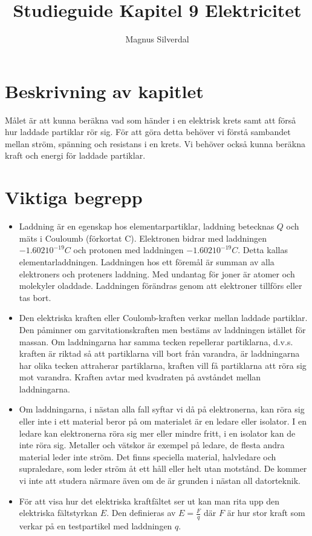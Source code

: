 \documentclass[11pt]{article}
\title{Studieguide Kapitel 9 Elektricitet}
\author{Magnus Silverdal}
\begin{document}
    \maketitle
    \section{Beskrivning av kapitlet}
    Målet är att kunna beräkna vad som händer i en elektrisk krets samt att förså hur laddade partiklar rör sig. För att
    göra detta behöver vi förstå sambandet mellan ström, spänning och resistans i en krets. Vi behöver också kunna beräkna kraft och energi
    för laddade partiklar.
    \section{Viktiga begrepp}
    \begin{itemize}
        \item Laddning är en egenskap hos elementarpartiklar, laddning betecknas $Q$ och mäts i Couloumb (förkortat C).
        Elektronen bidrar med laddningen $-1.602 10^{-19} C$ och protonen med laddningen $-1.602 10^{-19} C$. Detta kallas elementarladdningen.
        Laddningen hos ett föremål är summan av alla elektroners och proteners laddning. Med undantag för joner är atomer och molekyler oladdade.
        Laddningen förändras genom att elektroner tillförs eller tas bort.
        \item Den elektriska kraften eller Coulomb-kraften verkar mellan laddade partiklar. Den påminner om garvitationskraften men bestäms av laddningen istället för massan. Om laddningarna har samma tecken repellerar partiklarna,
        d.v.s. kraften är riktad så att partiklarna vill bort från varandra, är laddningarna har olika tecken attraherar partiklarna, kraften vill få partiklarna att röra sig mot varandra. Kraften avtar med kvadraten på avståndet mellan laddningarna.
        \item Om laddningarna, i nästan alla fall syftar vi då på elektronerna, kan röra sig eller inte i ett material beror på om materialet är en ledare eller isolator.
        I en ledare kan elektronerna röra sig mer eller mindre fritt, i en isolator kan de inte röra sig. Metaller och vätskor är exempel på ledare, de flesta andra material leder inte ström.
        Det finns speciella material, halvledare och supraledare, som leder ström åt ett håll eller helt utan motstånd. De kommer vi inte att studera närmare även om de är grunden i nästan all datorteknik.
        \item För att visa hur det elektriska kraftfältet ser ut kan man rita upp den elektriska fältstyrkan $E$. Den definieras av $E = \frac{F}{q}$ där $F$ är hur stor kraft som verkar på en testpartikel med laddningen $q$.

\end{itemize}
\end{document}
